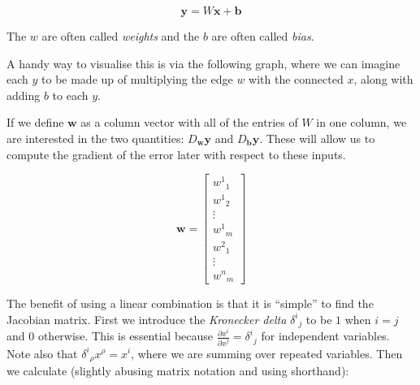\documentclass[a4paper]{article}
\theoremstyle{plain} %
\theoremstyle{definition} %
\numberwithin{equation}{subsection}
\newcommand{\del}[2]{\frac{\partial #1}{\partial #2}}
\newcommand{\vx}{{\textbf{x}}}
\newcommand{\vy}{{\textbf{y}}}
\newcommand{\vw}{{\textbf{w}}}
\newcommand{\vb}{{\textbf{b}}}
\begin{document}
\[ \vy = W \vx + \vb \]

The $w$ are often called \emph{weights} and the $b$ are often called \emph{bias}.

A handy way to visualise this is via the following graph, where we can imagine each $y$ to be made up of multiplying the edge $w$ with the connected $x$, along with adding $b$ to each $y$.



\begin{center}
\end{center}

If we define $\vw$ as a column vector with all of the entries of $W$ in one column, we are interested in the two quantities:
$D_\vw \vy$ and $D_\vb \vy$. These will allow us to compute the gradient of the error later with respect to these inputs.

\[ \vw =\begin{bmatrix}
  {w^1}_1 \\
  {w^1}_2 \\
  \vdots \\
  {w^1}_m \\
  {w^2}_1 \\
  \vdots \\
  {w^n}_m
\end{bmatrix} \]

The benefit of using a linear combination is that it is ``simple'' to find the Jacobian matrix. 
First we introduce the \emph{Kronecker delta} ${\delta^i}_j$ to be $1$ when $i=j$ and $0$ otherwise. 
This is essential because $\del{x^i}{x^j} = {\delta^i}_j$ for independent variables. 
Note also that ${\delta^i}_\rho x^\rho = x^i$, where we are summing over repeated variables.
Then we calculate (slightly abusing matrix notation and using shorthand):
\end{document}
